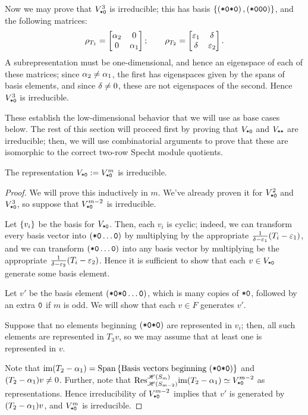 \documentclass{amsart}
\begin{document}
Now we may prove that $V^3_{\texttt{*}\texttt{0}}$ is irreducible;
this has basis $\left\{ \left( \texttt{*}\texttt{0}\texttt{*}\texttt{0} \right), \left( \texttt{*}\texttt{0}\texttt{0}\texttt{0} \right) \right\}$, and the following matrices:
\[
  \rho_{T_1} = \begin{bmatrix}
    \alpha_2 & 0\\
    0 & \alpha_1
  \end{bmatrix}; \hspace{20pt}
  \rho_{T_2} = \begin{bmatrix}
    \varepsilon_1 & \delta\\
    \delta & \varepsilon_2
  \end{bmatrix}.
\]
A subrepresentation must be one-dimensional, and hence an eigenspace of each of these matrices;
since $\alpha_2 \neq \alpha_1$, the first has eigenspaces given by the spans of basis elements, and since $\delta \neq 0$, these are not eigenspaces of the second.
Hence $V^3_{\texttt{*}\texttt{0}}$ is irreducible.

These establish the low-dimensional behavior that we will use as base cases below.
The rest of this section will proceed first by proving that $V_{\texttt{*}\texttt{0}}$ and $V_{\texttt{*}\texttt{*}}$ are irreducible;
then, we will use combinatorial arguments to prove that these are isomorphic to the correct two-row Specht module quotients.

\begin{proposition}
  The representation $V_{\texttt{*}\texttt{0}} := V^m_{\texttt{*}\texttt{0}}$ is irreducible.
\end{proposition}
\begin{proof}
  We will prove this inductively in $m$.
  We've already proven it for $V^2_{\texttt{*}\texttt{0}}$ and $V^3_{\texttt{*}\texttt{0}}$, so suppose that $V^{m-2}_{\texttt{*}\texttt{0}}$ is irreducible.
  
  Let $\left\{ v_i \right\}$ be the basis for $V_{\texttt{*}\texttt{0}}$.
  Then, each $v_i$ is cyclic; indeed, we can transform every basis vector into $(\texttt{*}\texttt{0} \dots \texttt{0})$ by multiplying by the appropriate $\frac{1}{\delta-\varepsilon_1}(T_i - \varepsilon_1)$, and we can transform $(\texttt{*}\texttt{0} \dots \texttt{0})$ into any basis vector by multiplying be the appropriate $\frac{1}{\delta-\varepsilon_2}(T_i - \varepsilon_2)$.
  Hence it is sufficient to show that each $v \in V_{\texttt{*}\texttt{0}}$ generate some basis element.

  Let $v'$ be the basis element $(\texttt{*}\texttt{0}\texttt{*}\texttt{0}\dots \texttt{0})$, which is many copies of $\texttt{*}\texttt{0}$, followed by an extra $\texttt{0}$ if $m$ is odd.
  We will show that each $v \in F$ generates $v'$.

  Suppose that no elements beginning $(\texttt{*}\texttt{0}\texttt{*}\texttt{0})$ are represented in $v_i$;
  then, all such elements are represented in $T_3v$, so we may assume that at least one is represented in $v$.

  Note that $\text{im} (T_2 - \alpha_1) = \text{Span}\left\{ \text{Basis vectors beginning }(\texttt{*}\texttt{0}\texttt{*}\texttt{0}) \right\}$ and $(T_2 - \alpha_1)v \neq 0$.
  Further, note that $\text{Res}_{\mathscr{H}(S_{m-2})}^{\mathscr{H}(S_m)} \text{im} (T_2 - \alpha_1) \simeq V^{m-2}_{\texttt{*}\texttt{0}}$ as representations.
  Hence irreducibility of $V^{m-2}_{\texttt{*}\texttt{0}}$ implies that $v'$ is generated by $(T_2 - \alpha_1)v$, and $V^m_{\texttt{*}\texttt{0}}$ is irreducible.
\end{proof}
\end{document}
